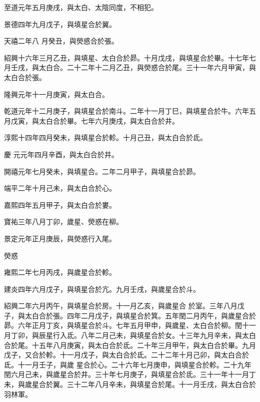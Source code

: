 \begin{pinyinscope}
 至道元年五月庚戌，與太白、太陰同度，不相犯。



 景德四年九月戊子，與填星合於翼。



 天禧二年八
 月癸丑，與熒惑合於張。



 紹興十六年三月乙丑，與填星、太白合於昴。十月戊戌，與填星合於畢。十七年七月壬戌，與太白合。二十二年十二月乙丑，與熒惑合於尾。三十一年六月甲寅，與太白合於張。



 隆興元年十一月庚寅，與太白合。



 乾道元年十二月庚子，與填星合於南斗。二年十一月丁巳，與填星合於牛。六年五月戊寅，與太白合於畢。七年六月庚戌，與太白合於井。



 淳熙十四年四月癸未，與填星合於軫。十月己丑，與太白合於氐。



 慶
 元元年四月辛酉，與太白合於井。



 開禧元年七月癸未，與填星合。二年二月甲子，與填星合於昴。



 端平二年十月己未，與太白合於心。



 嘉熙四年五月甲子，與太白合於婁。



 寶祐三年八月丁卯，歲星、熒惑在柳。



 景定元年正月庚辰，與熒惑行入尾。



 熒惑



 雍熙二年七月丙戌，與歲星合於軫。



 建炎四年六月戊子，與填星合於亢。九月壬戌，與歲星合於斗。



 紹興二年六月丙午，與填星合於房。十一月乙亥，與歲星合
 於室。三年八月戊子，與太白合於張。四年二月戊子，與填星合於箕。五年閏二月丙午，與歲星合於昴。六年正月丁亥，與填星合於斗。七年五月甲申，與歲星、太白合於柳。閏十一月丁卯，與辰星行入氐。八年二月己未，與填星合於女。十三年九月辛未，與太白合於尾。十五年八月庚寅，與太白合於氐。二十年三月甲午，與太白合於畢。九月戊子，又合於軫。十一月戊子，與太白合於氐。二十二年十月己卯，與太白合於氐。十一月壬子，與歲
 星合於心。二十六年七月庚申，與填星合於軫。二十九年閏六月己未，與歲星合於井。三十年七月庚子，與填星合於氐。三十一年十一月丁未，與歲星合於翼。三十二年八月辛未，與填星合於尾。十一月壬戌，與太白合於羽林軍。




\end{pinyinscope}
